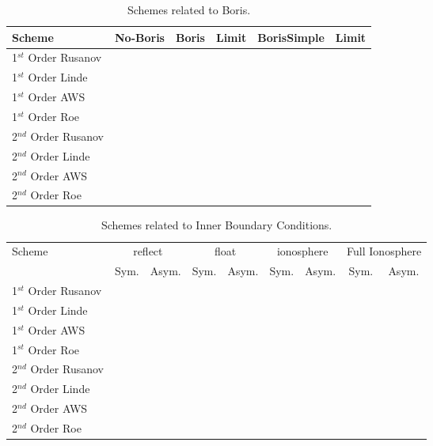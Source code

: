 \documentclass[10pt]{article}
\begin{document}
\begin{table}[!h]
\begin{tabular}{|l|c|c|c|c|c|} \hline
Scheme                   & No-Boris & Boris & Limit & BorisSimple & Limit \\ \hline
1$^{st}$ Order Rusanov   &          &       &       &             &       \\ \hline
1$^{st}$ Order Linde     &          &       &       &             &       \\ \hline
1$^{st}$ Order AWS       &          &       &       &             &       \\ \hline
1$^{st}$ Order Roe       &          &       &       &             &       \\ \hline
2$^{nd}$ Order Rusanov   &          &       &       &             &       \\ \hline
2$^{nd}$ Order Linde     &          &       &       &             &       \\ \hline
2$^{nd}$ Order AWS       &          &       &       &             &       \\ \hline
2$^{nd}$ Order Roe       &          &       &       &             &       \\ \hline
\end{tabular}
\caption{Schemes related to Boris.}
\end{table} 


\begin{table}[!h]
\begin{tabular}{|l|c|c|c|c|c|c|c|c|} \hline
Scheme                   & \multicolumn{2}{c|}{reflect} & \multicolumn{2}{c|}{float} &   \multicolumn{2}{c|}{ionosphere} & \multicolumn{2}{c|}{Full Ionosphere}\\ \cline{2-9}
                         &  Sym. & Asym. & Sym. & Asym.  & Sym. & Asym. & Sym. & Asym.             \\ \hline
1$^{st}$ Order Rusanov   &  &&     & &&   &&        \\ \hline
1$^{st}$ Order Linde     &  &&     & &&   &&        \\ \hline
1$^{st}$ Order AWS       &  &&     & &&   &&        \\ \hline
1$^{st}$ Order Roe       &  &&     & &&   &&        \\ \hline
2$^{nd}$ Order Rusanov   &  &&     & &&   &&        \\ \hline
2$^{nd}$ Order Linde     &  &&     & &&   &&        \\ \hline
2$^{nd}$ Order AWS       &  &&     & &&   &&        \\ \hline
2$^{nd}$ Order Roe       &  &&     & &&   &&        \\ \hline
\end{tabular}
\caption{Schemes related to Inner Boundary Conditions.}
\end{table} 
\end{document}
